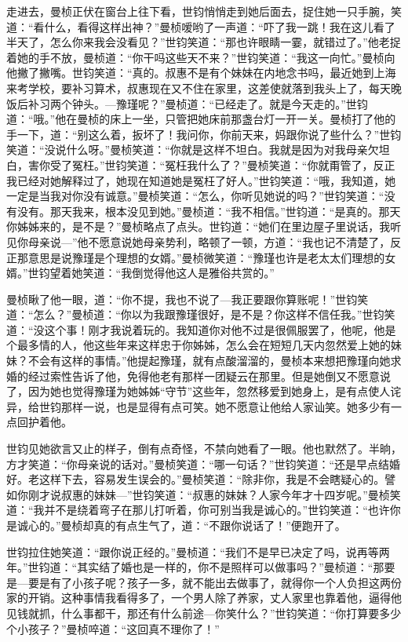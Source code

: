 \par 走进去，曼桢正伏在窗台上往下看，世钧悄悄走到她后面去，捉住她一只手腕，笑道：“看什么，看得这样出神？”曼桢嗳哟了一声道：“吓了我一跳！我在这儿看了半天了，怎么你来我会没看见？”世钧笑道：“那也许眼睛一霎，就错过了。”他老捉着她的手不放，曼桢道：“你干吗这些天不来？”世钧笑道：“我这一向忙。”曼桢向他撇了撇嘴。世钧笑道：“真的。叔惠不是有个妹妹在内地念书吗，最近她到上海来考学校，要补习算术，叔惠现在又不住在家里，这差使就落到我头上了，每天晚饭后补习两个钟头。—豫瑾呢？”曼桢道：“已经走了。就是今天走的。”世钧道：“哦。”他在曼桢的床上一坐，只管把她床前那盏台灯一开一关。曼桢打了他的手一下，道：“别这么着，扳坏了！我问你，你前天来，妈跟你说了些什么？”世钧笑道：“没说什么呀。”曼桢笑道：“你就是这样不坦白。我就是因为对我母亲欠坦白，害你受了冤枉。”世钧笑道：“冤枉我什么了？”曼桢笑道：“你就甭管了，反正我已经对她解释过了，她现在知道她是冤枉了好人。”世钧笑道：“哦，我知道，她一定是当我对你没有诚意。”曼桢笑道：“怎么，你听见她说的吗？”世钧笑道：“没有没有。那天我来，根本没见到她。”曼桢道：“我不相信。”世钧道：“是真的。那天你姊姊来的，是不是？”曼桢略点了点头。世钧道：“她们在里边屋子里说话，我听见你母亲说—”他不愿意说她母亲势利，略顿了一顿，方道：“我也记不清楚了，反正那意思是说豫瑾是个理想的女婿。”曼桢微笑道：“豫瑾也许是老太太们理想的女婿。”世钧望着她笑道：“我倒觉得他这人是雅俗共赏的。”
\par 曼桢瞅了他一眼，道：“你不提，我也不说了—我正要跟你算账呢！”世钧笑道：“怎么？”曼桢道：“你以为我跟豫瑾很好，是不是？你这样不信任我。”世钧笑道：“没这个事！刚才我说着玩的。我知道你对他不过是很佩服罢了，他呢，他是个最多情的人，他这些年来这样忠于你姊姊，怎么会在短短几天内忽然爱上她的妹妹？不会有这样的事情。”他提起豫瑾，就有点酸溜溜的，曼桢本来想把豫瑾向她求婚的经过索性告诉了他，免得他老有那样一团疑云在那里。但是她倒又不愿意说了，因为她也觉得豫瑾为她姊姊“守节”这些年，忽然移爱到她身上，是有点使人诧异，给世钧那样一说，也是显得有点可笑。她不愿意让他给人家讪笑。她多少有一点回护着他。
\par 世钧见她欲言又止的样子，倒有点奇怪，不禁向她看了一眼。他也默然了。半晌，方才笑道：“你母亲说的话对。”曼桢笑道：“哪一句话？”世钧笑道：“还是早点结婚好。老这样下去，容易发生误会的。”曼桢笑道：“除非你，我是不会瞎疑心的。譬如你刚才说叔惠的妹妹—”世钧笑道：“叔惠的妹妹？人家今年才十四岁呢。”曼桢笑道：“我并不是绕着弯子在那儿打听着，你可别当我是诚心的。”世钧笑道：“也许你是诚心的。”曼桢却真的有点生气了，道：“不跟你说话了！”便跑开了。
\par 世钧拉住她笑道：“跟你说正经的。”曼桢道：“我们不是早已决定了吗，说再等两年。”世钧道：“其实结了婚也是一样的，你不是照样可以做事吗？”曼桢道：“那要是—要是有了小孩子呢？孩子一多，就不能出去做事了，就得你一个人负担这两份家的开销。这种事情我看得多了，一个男人除了养家，丈人家里也靠着他，逼得他见钱就抓，什么事都干，那还有什么前途—你笑什么？”世钧笑道：“你打算要多少个小孩子？”曼桢啐道：“这回真不理你了！”
